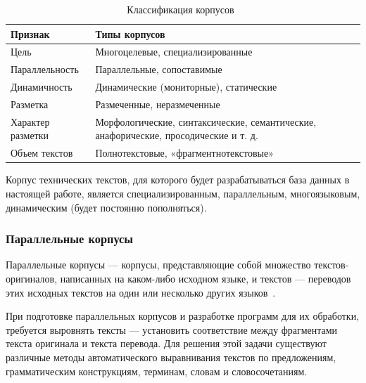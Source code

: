 \begin{table}[H]
    \centering
    \begin{tabular}{|p{5cm}|p{11cm}|}
        \hline
        \textbf{Признак} & \textbf{Типы корпусов} \\ \hline
        Цель & Многоцелевые, специализированные \\ \hline
        Параллельность & Параллельные, сопоставимые \\ \hline
        Динамичность & Динамические (мониторные), статические \\ \hline
        Разметка & Размеченные, неразмеченные \\ \hline
        Характер разметки & Морфологические, синтаксические, семантические, анафорические, просодические и т. д. \\ \hline
        Объем текстов & Полнотекстовые, «фрагментнотекстовые» \\ \hline
    \end{tabular}
    \caption{Классификация корпусов~\cite{cl2020}}
    \label{tab:cc}
\end{table}

Корпус технических текстов, для которого будет разрабатываться база данных в настоящей работе, является специализированным, параллельным, многоязыковым, динамическим (будет постоянно пополняться).

\subsubsection*{Параллельные корпусы}

Параллельные корпусы --- корпусы, представляющие собой множество текстов-оригиналов, написанных на каком-либо исходном языке, и текстов --- переводов этих исходных текстов на один или несколько других языков~\cite{cl2020}.

При подготовке параллельных корпусов и разработке программ для их обработки, требуется выровнять тексты --- установить соответствие между фрагментами текста оригинала и текста перевода.
Для решения этой задачи существуют различные методы автоматического выравнивания текстов по предложениям, грамматическим конструкциям, терминам, словам и словосочетаниям.~\cite{cl2020}

